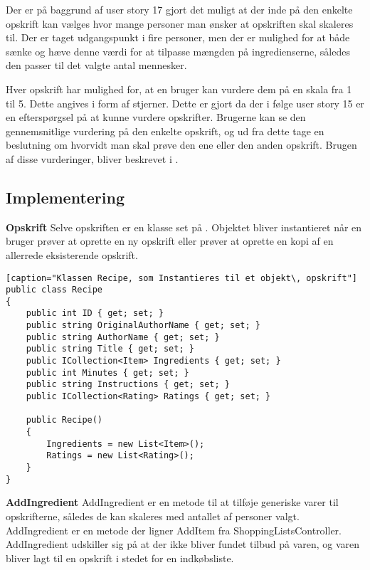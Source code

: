Der er på baggrund af user story 17 gjort det muligt at der inde på den enkelte opskrift kan vælges hvor mange personer man ønsker at opskriften skal skaleres til.
Der er taget udgangspunkt i fire personer, men der er mulighed for at både sænke og hæve denne værdi for at tilpasse mængden på ingredienserne, således den passer til det valgte antal mennesker.


Hver opskrift har mulighed for, at en bruger kan vurdere dem på en skala fra 1 til 5.
Dette angives i form af stjerner.
Dette er gjort da der i følge user story 15 er en efterspørgsel på at kunne vurdere opskrifter.
Brugerne kan se den gennemsnitlige vurdering på den enkelte opskrift, og ud fra dette tage en beslutning om hvorvidt man skal prøve den ene eller den anden opskrift.
Brugen af disse vurderinger, bliver beskrevet i .


\subsection{Implementering}
\textbf{Opskrift}
Selve opskriften er en klasse set på .
Objektet bliver instantieret når en bruger prøver at oprette en ny opskrift eller prøver at oprette en kopi af en allerrede eksisterende opskrift.


\begin{lstlisting}[caption="Klassen Recipe, som Instantieres til et objekt\, opskrift"]
public class Recipe
{
    public int ID { get; set; }
    public string OriginalAuthorName { get; set; }
    public string AuthorName { get; set; }
    public string Title { get; set; }
    public ICollection<Item> Ingredients { get; set; }
    public int Minutes { get; set; }
    public string Instructions { get; set; }
    public ICollection<Rating> Ratings { get; set; }

    public Recipe()
    {
        Ingredients = new List<Item>();
        Ratings = new List<Rating>();
    }
}
\end{lstlisting}

\textbf{AddIngredient}
AddIngredient er en metode til at tilføje generiske varer til opskrifterne, således de kan skaleres med antallet af personer valgt. 
AddIngredient er en metode der ligner AddItem fra ShoppingListsController. 
AddIngredient udskiller sig på at der ikke bliver fundet tilbud på varen, og varen bliver lagt til en opskrift i stedet for en indkøbsliste.


